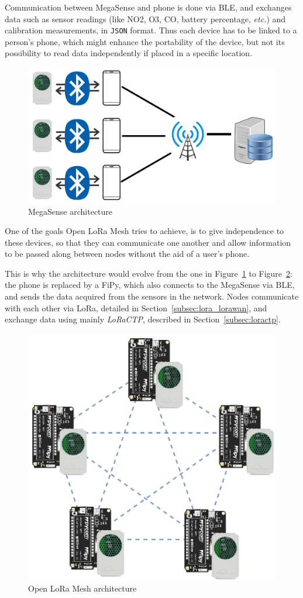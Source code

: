 		Communication between MegaSense and phone is done via BLE, and exchanges data such as sensor readings (like NO2,
		O3, CO, battery percentage, \textit{etc.}) and calibration measurements, in \texttt{JSON} format.
		Thus each device has to be linked to a person's phone, which might enhance the portability of the device, but not its possibility to read data independently if placed in a specific location.
		
		\begin{figure}[h]
			\centering
			\includegraphics[width=.75\textwidth]{resources/img/chap5/architecture_megasense}
			\caption{MegaSense architecture}
			\label{img:megasense_architecture}
		\end{figure}
	
		One of the goals Open LoRa Mesh tries to achieve, is to give independence to these devices, so that they can communicate one another and allow information to be passed along between nodes without the aid of a user's phone.
	
		This is why the architecture would evolve from the one in Figure~\ref{img:megasense_architecture} to Figure~\ref{img:openmesh_architecture}: the phone is replaced by a FiPy, which also connects to the MegaSense via BLE, and sends the data acquired from the sensors in the network.
		Nodes communicate with each other via LoRa, detailed in Section~\ref{subsec:lora_lorawan}, and exchange data using mainly \textit{LoRaCTP}, described in Section~\ref{subsec:loractp}.
		
		\begin{figure}[h]
			\centering
			\includegraphics[width=.7\textwidth]{resources/img/chap5/mesh-architecture-1}
			\caption{Open LoRa Mesh architecture}
			\label{img:openmesh_architecture}
		\end{figure}
		
